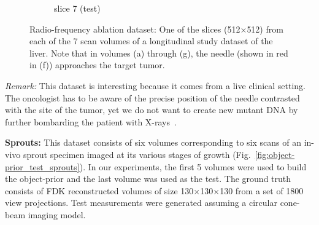 \documentclass[journal]{IEEEtran}
\begin{document}
\begin{figure}[h!]
\begin{subfigure}[b]{0.23\linewidth}
 \caption{slice 7 (test)}
    \end{subfigure}     
     \caption{Radio-frequency ablation dataset: One of the slices
       (512$\times$512) from each of the 7 scan volumes of a
       longitudinal study dataset of the liver. Note that in volumes
       (a) through (g), the needle (shown in red in (f)) approaches
       the target tumor.}
\label{fig:RFA2_test_object-prior}
\end{figure}

\textit{Remark:} This dataset is interesting because it comes from a live
clinical setting.  The oncologist has to be aware of the
precise position of the needle contrasted with the site of the tumor,
yet we do not want to create new mutant DNA by further bombarding the
patient with X-rays~\cite{damage_repeated_CT}.


\textbf{Sprouts:} This dataset consists of six volumes corresponding
to six scans of an in-vivo sprout specimen imaged at its various
stages of growth (Fig.~\ref{fig:object-prior_test_sprouts}).  In our
experiments, the first 5 volumes were used to build the object-prior
and the last volume was used as the test. The ground truth consists of
FDK reconstructed volumes of size 130$\times$130$\times$130 from a set
of 1800 view projections. Test measurements were generated assuming a
circular cone-beam imaging model.

\end{document}
